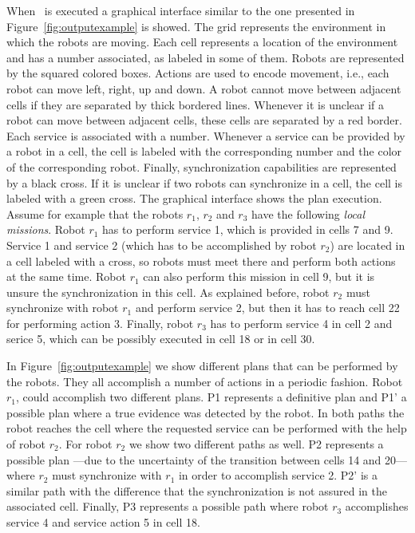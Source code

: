 When  \toolName\ is executed a graphical interface similar to the one presented  in Figure~\ref{fig:outputexample} is showed.
The grid represents the environment in which the robots are moving.
Each cell represents a location of the environment and has a number associated, as labeled in some of them.
Robots are represented by the squared colored boxes.
Actions are used to encode movement, i.e., each robot can move left, right, up and down.
A robot  cannot move between adjacent cells if they are separated by thick bordered lines.
Whenever  it is unclear if a robot can move between adjacent cells, these cells are separated by a red border.
Each service is associated with a number.
Whenever a service can be provided by a robot in a cell, the cell is labeled with the corresponding number and the color of the corresponding robot.
Finally, synchronization capabilities are represented by a black cross.
If it is unclear if two robots can synchronize in a cell, the cell is labeled with a green cross.
The graphical interface shows the plan execution.
Assume for example that the robots $r_1$, $r_2$ and $r_3$ have the following \emph{local missions}.
Robot $r_1$ has to perform service 1, which is provided in cells 7 and 9.
Service 1 and service 2 (which has to be accomplished by robot $r_2$) are located in a cell labeled with a cross, so robots must meet there and perform both actions at the same time.
Robot $r_1$ can also perform this mission in cell 9, but it is unsure the synchronization in this cell.
As explained before, robot $r_2$ must synchronize with robot $r_1$ and perform service 2, but then it has to reach cell 22 for performing action 3.
Finally, robot $r_3$ has to perform service 4 in cell 2 and serice 5, which can be possibly executed in cell 18 or in cell 30.

In Figure~\ref{fig:outputexample} we show different plans that can be performed by the robots. 
They all accomplish a number of actions in a periodic fashion.
Robot $r_1$, could accomplish two different plans.
P1 represents a definitive plan and P1' a possible plan where a true evidence was detected by the robot.
In both paths the robot reaches the cell where the requested service can be performed with the help of robot $r_2$.
For robot $r_2$ we show two different paths as well.
P2 represents a possible plan ---due to the uncertainty of the transition between cells 14 and 20--- where $r_2$ must synchronize with $r_1$ in order to accomplish service 2.
P2' is a similar path with the difference that the synchronization is not assured in the associated cell.
Finally, P3 represents a possible path where robot $r_3$ accomplishes service 4 and service action 5 in cell 18.

